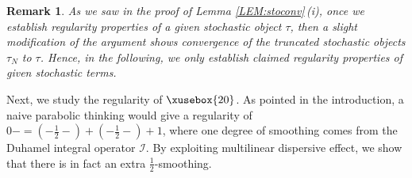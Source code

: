 \documentclass[%
11pt,  reqno]{amsart}
\def\<#1>{\xusebox{#1}}
\newtheorem{remark}[theorem]{Remark}
\newcommand{\1}{\hspace{0.2mm}\text{I}\hspace{0.2mm}}
\newcommand{\I}{\mathcal{I}}
\numberwithin{equation}{section}
\numberwithin{theorem}{section}
\begin{document}
\begin{remark}\rm
As we saw in the proof of Lemma \ref{LEM:stoconv}\,(i), 
once we establish regularity properties of a given stochastic object $\tau$, 
then a slight modification of the argument
shows convergence of the truncated stochastic objects
$\tau_N$ to $\tau$.
Hence, in the following, we only establish claimed regularity properties
of given stochastic terms.

\end{remark}




Next, we study the regularity of $\<20>$.
As pointed in the introduction, 
a naive parabolic thinking
would give a regularity of $0- = (-\frac 12-) + (-\frac 12-) + 1$, 
where one degree of smoothing comes from the Duhamel integral operator $\I$.
By exploiting multilinear dispersive effect, 
we show that there is in fact an extra $\frac12$-smoothing.
\end{document}
